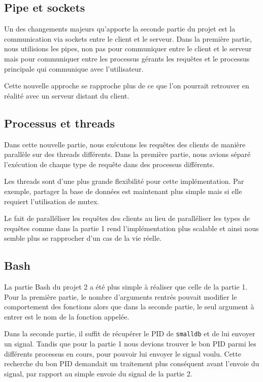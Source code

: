 \documentclass[utf8]{article}
\begin{document}
\subsection{Pipe et sockets}

Un des changements majeurs qu'apporte la seconde partie du projet est la communication via sockets entre le client et le serveur. Dans la première partie, nous utilisions les pipes, non pas pour communiquer entre le client et le serveur mais pour communiquer entre les processus gérants les requêtes et le processus principale qui communique avec l'utilisateur.

Cette nouvelle approche se rapproche plus de ce que l'on pourrait retrouver en réalité avec un serveur distant du client.


\subsection{Processus et threads}

Dans cette nouvelle partie, nous exécutons les requêtes des clients de manière parallèle sur des threads différents. Dans la première partie, nous avions séparé l'exécution de chaque type de requête dans des processus différents.

Les threads sont d'une plus grande flexibilité pour cette implémentation. Par exemple, partager la base de données est maintenant plus simple mais si elle requiert l'utilisation de mutex.

Le fait de paralléliser les requêtes des clients au lieu de paralléliser les types de requêtes comme dans la partie 1 rend l'implémentation plus scalable et ainsi nous semble plus se rapprocher d'un cas de la vie réelle.


\subsection{Bash}

La partie Bash du projet 2  a été plus simple à réaliser que celle de la partie 1.
Pour la première partie, le nombre d'arguments rentrés pouvait modifier le comportement des fonctions alors que dans la seconde partie, le seul argument à entrer est le nom de la fonction appelée.

Dans la seconde partie, il suffit de récupérer le PID de \texttt{smalldb} et de lui envoyer un signal. Tandis que pour la partie 1 nous devions trouver le bon PID parmi les différents processus en cours, pour pouvoir lui envoyer le signal voulu. Cette recherche du bon PID demandait un traitement plus conséquent avant l'envoie du signal, par rapport au simple envoie du signal de la partie 2. 
\end{document}
